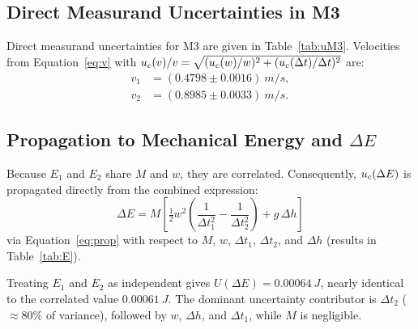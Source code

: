 \documentclass[a4paper, 12pt]{article}
\begin{document}
\subsection{Direct Measurand Uncertainties in M3}
        Direct measurand uncertainties for M3 are given in Table~\ref{tab:uM3}. Velocities from Equation~\eqref{eq:v} with $u_{c}(v)/v=\sqrt{(u_{c}(w)/w)^2+(u_{c}(\Delta t)/\Delta t)^2}$ are:
        \begin{align*}
            v_1 &= (0.4798\pm0.0016)\ \si{m/s},\\
            v_2 &= (0.8985\pm0.0033)\ \si{m/s}.
        \end{align*}

        \subsection{Propagation to Mechanical Energy and \texorpdfstring{$\Delta E$}{Delta E}}
        Because $E_1$ and $E_2$ share $M$ and $w$, they are correlated. Consequently, $u_{c}(\Delta E)$ is propagated directly from the combined expression:
        \begin{equation}
            \Delta E=M\left[\tfrac{1}{2}w^{2}\left(\frac{1}{\Delta t_1^{2}}-\frac{1}{\Delta t_2^{2}}\right)+g\,\Delta h\right]
            \label{eq:dEfull}
        \end{equation}
        via Equation~\eqref{eq:prop} with respect to $M$, $w$, $\Delta t_1$, $\Delta t_2$, and $\Delta h$ (results in Table~\ref{tab:E}).

        Treating $E_1$ and $E_2$ as independent gives $U(\Delta E)=\SI{0.00064}{J}$, nearly identical to the correlated value $\SI{0.00061}{J}$. The dominant uncertainty contributor is $\Delta t_2$ ($\approx 80\%$ of variance), followed by $w$, $\Delta h$, and $\Delta t_1$, while $M$ is negligible.
\end{document}
